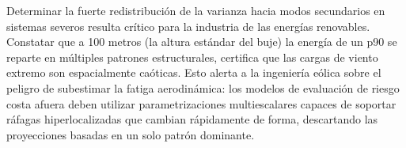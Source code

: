 Determinar la fuerte redistribución de la varianza hacia modos secundarios en sistemas severos resulta crítico para la industria de las energías renovables. Constatar que a 100 metros (la altura estándar del buje) la energía de un p90 se reparte en múltiples patrones estructurales, certifica que las cargas de viento extremo son espacialmente caóticas. Esto alerta a la ingeniería eólica sobre el peligro de subestimar la fatiga aerodinámica: los modelos de evaluación de riesgo costa afuera deben utilizar parametrizaciones multiescalares capaces de soportar ráfagas hiperlocalizadas que cambian rápidamente de forma, descartando las proyecciones basadas en un solo patrón dominante.



